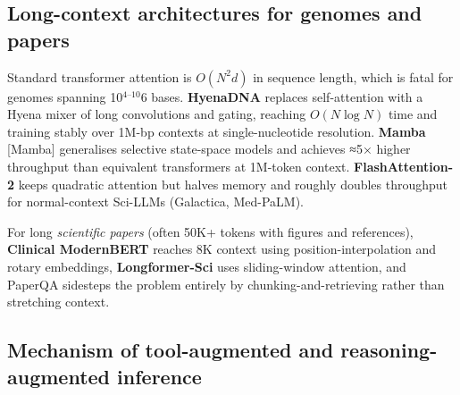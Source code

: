 \documentclass{article}
\providecommand{\textsuperscript}[1]{\ensuremath{^{\text{#1}}}}
\begin{document}
\subsection{Long-context architectures for genomes and papers}\label{long-context-architectures-for-genomes-and-papers}

Standard transformer attention is \(O(N^2 d)\) in sequence length, which is fatal for genomes spanning 10\textsuperscript{4--10}6 bases. \textbf{HyenaDNA} \cite{nguyen2023hyenadnalongrangeg} replaces self-attention with a Hyena mixer of long convolutions and gating, reaching \(O(N \log N)\) time and training stably over 1M-bp contexts at single-nucleotide resolution. \textbf{Mamba} {[}Mamba{]} generalises selective state-space models and achieves ≈5× higher throughput than equivalent transformers at 1M-token context. \textbf{FlashAttention-2} keeps quadratic attention but halves memory and roughly doubles throughput for normal-context Sci-LLMs (Galactica, Med-PaLM).

For long \emph{scientific papers} (often 50K+ tokens with figures and references), \textbf{Clinical ModernBERT} \cite{lee2025arxiv2504039642025} reaches 8K context using position-interpolation and rotary embeddings, \textbf{Longformer-Sci} uses sliding-window attention, and PaperQA \cite{ala2023arxiv2312075592023} sidesteps the problem entirely by chunking-and-retrieving rather than stretching context.

\subsection{Mechanism of tool-augmented and reasoning-augmented inference}\label{mechanism-of-tool-augmented-and-reasoning-augmented-inference}
\end{document}
